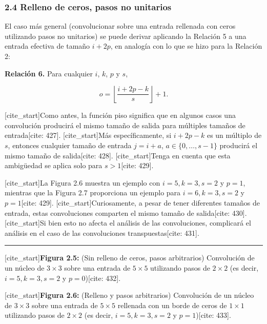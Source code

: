 \documentclass[
  super,
  preprint,
  3p]{elsarticle}
\begin{document}
\subsubsection{2.4 Relleno de ceros, pasos no
unitarios}\label{relleno-de-ceros-pasos-no-unitarios}

El caso más general (convolucionar sobre una entrada rellenada con ceros
utilizando pasos no unitarios) se puede derivar aplicando la Relación 5
a una entrada efectiva de tamaño \(i + 2p\), en analogía con lo que se
hizo para la Relación 2:

\textbf{Relación 6.} Para cualquier \(i\), \(k\), \(p\) y \(s\),

\[o = \left\lfloor \frac{i + 2p - k}{s} \right\rfloor + 1.\]

{[}cite\_start{]}Como antes, la función piso significa que en algunos
casos una convolución producirá el mismo tamaño de salida para múltiples
tamaños de entrada{[}cite: 427{]}. {[}cite\_start{]}Más específicamente,
si \(i + 2p - k\) es un múltiplo de \(s\), entonces cualquier tamaño de
entrada \(j = i + a\), \(a \in \{0, \dots, s-1\}\) producirá el mismo
tamaño de salida{[}cite: 428{]}. {[}cite\_start{]}Tenga en cuenta que
esta ambigüedad se aplica solo para \(s > 1\){[}cite: 429{]}.

{[}cite\_start{]}La Figura 2.6 muestra un ejemplo con
\(i = 5, k = 3, s = 2\) y \(p = 1\), mientras que la Figura 2.7
proporciona un ejemplo para \(i = 6, k = 3, s = 2\) y \(p = 1\){[}cite:
429{]}. {[}cite\_start{]}Curiosamente, a pesar de tener diferentes
tamaños de entrada, estas convoluciones comparten el mismo tamaño de
salida{[}cite: 430{]}. {[}cite\_start{]}Si bien esto no afecta el
análisis de las convoluciones, complicará el análisis en el caso de las
convoluciones transpuestas{[}cite: 431{]}.

\begin{center}\rule{0.5\linewidth}{0.5pt}\end{center}

{[}cite\_start{]}\textbf{Figura 2.5:} (Sin relleno de ceros, pasos
arbitrarios) Convolución de un núcleo de \(3 \times 3\) sobre una
entrada de \(5 \times 5\) utilizando pasos de \(2 \times 2\) (es decir,
\(i = 5, k = 3, s = 2\) y \(p = 0\)){[}cite: 432{]}.

{[}cite\_start{]}\textbf{Figura 2.6:} (Relleno y pasos arbitrarios)
Convolución de un núcleo de \(3 \times 3\) sobre una entrada de
\(5 \times 5\) rellenada con un borde de ceros de \(1 \times 1\)
utilizando pasos de \(2 \times 2\) (es decir, \(i = 5, k = 3, s = 2\) y
\(p = 1\)){[}cite: 433{]}.
\end{document}
